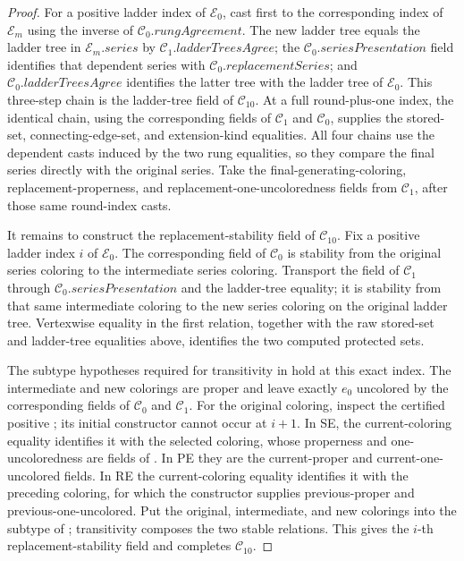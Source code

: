 \begin{proof}
For a positive ladder index of \(\mathcal E_0\), cast first to the
corresponding index of \(\mathcal E_m\) using the inverse of
\(\mathcal C_0.\mathit{rungAgreement}\).  The new ladder tree equals the
ladder tree in \(\mathcal E_m.\mathit{series}\) by
\(\mathcal C_1.\mathit{ladderTreesAgree}\); the
\(\mathcal C_0.\mathit{seriesPresentation}\) field identifies that
dependent series with \(\mathcal C_0.\mathit{replacementSeries}\); and
\(\mathcal C_0.\mathit{ladderTreesAgree}\) identifies the latter tree
with the ladder tree of \(\mathcal E_0\).  This three-step chain is the
ladder-tree field of \(\mathcal C_{10}\).  At a full round-plus-one
index, the identical chain, using the corresponding fields of
\(\mathcal C_1\) and \(\mathcal C_0\), supplies the stored-set,
connecting-edge-set, and extension-kind equalities.  All four chains use
the dependent casts induced by the two rung equalities, so they compare
the final series directly with the original series.  Take the
final-generating-coloring, replacement-properness, and
replacement-one-uncoloredness fields from \(\mathcal C_1\), after those
same round-index casts.

It remains to construct the replacement-stability field of
\(\mathcal C_{10}\).  Fix a positive ladder index \(i\) of
\(\mathcal E_0\).  The corresponding field of \(\mathcal C_0\) is
stability from the original series coloring to the intermediate series
coloring.  Transport the field of \(\mathcal C_1\) through
\(\mathcal C_0.\mathit{seriesPresentation}\) and the ladder-tree
equality; it is stability from that same intermediate coloring to the new
series coloring on the original ladder tree.  Vertexwise equality in the
first relation, together with the raw stored-set and ladder-tree
equalities above, identifies the two computed protected
 sets.

The subtype hypotheses required for transitivity in  hold
at this exact index.  The intermediate and new colorings are proper and
leave exactly \(e_0\) uncolored by the corresponding fields of
\(\mathcal C_0\) and \(\mathcal C_1\).  For the original coloring,
inspect the certified positive ; its initial
constructor cannot occur at \(i+1\).  In SE, the current-coloring equality
identifies it with the selected coloring, whose properness and
one-uncoloredness are fields of .  In PE
they are the current-proper and current-one-uncolored fields.  In RE the
current-coloring equality identifies it with the preceding coloring, for
which the constructor supplies previous-proper and
previous-one-uncolored.  Put the original, intermediate, and new
colorings into the subtype of ; transitivity composes the two
stable relations.  This gives the \(i\)-th replacement-stability field and
completes \(\mathcal C_{10}\).


\end{proof}
